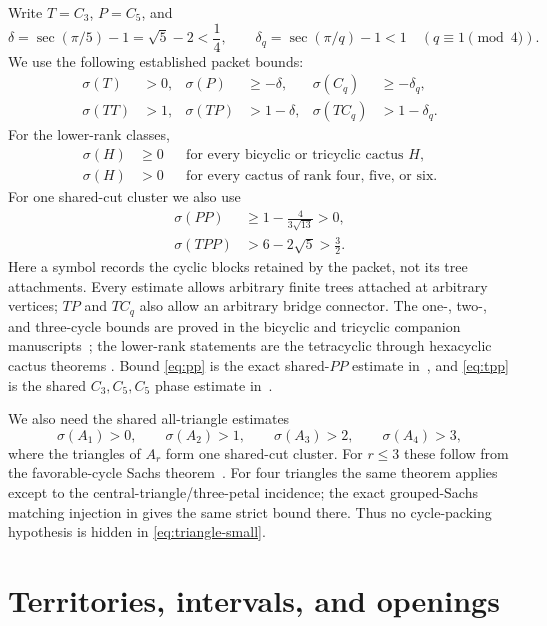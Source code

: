 \documentclass[11pt]{article}
\newcommand{\sig}{\sigma}
\begin{document}
Write $T=C_3$, $P=C_5$, and
\[
 \delta=\sec(\pi/5)-1=\sqrt5-2<\frac14,
 \qquad
 \delta_q=\sec(\pi/q)-1<1\quad(q\equiv1\pmod4).
\]
We use the following established packet bounds:
\begin{align}
 \sig(T)&>0,& \sig(P)&\geq-\delta,&
 \sig(C_q)&\geq-\delta_q,\label{eq:one}\\
 \sig(TT)&>1,& \sig(TP)&>1-\delta,&
 \sig(TC_q)&>1-\delta_q.\label{eq:two}
\end{align}
For the lower-rank classes,
\begin{align}
 \sig(H)&\geq0 &&\text{for every bicyclic or tricyclic cactus }H,
 \label{eq:small}\\
 \sig(H)&>0 &&\text{for every cactus of rank four, five, or six}.
 \label{eq:lower-rank}
\end{align}
For one shared-cut cluster we also use
\begin{align}
 \sig(PP)&\geq1-\frac4{3\sqrt{13}}>0,\label{eq:pp}\\
 \sig(TPP)&>6-2\sqrt5>\frac32.\label{eq:tpp}
\end{align}
Here a symbol records the cyclic blocks retained by the packet, not its tree
attachments.  Every estimate allows arbitrary finite trees attached at
arbitrary vertices; $TP$ and $TC_q$ also allow an arbitrary bridge connector.
The one-, two-, and three-cycle bounds are proved in the bicyclic and
tricyclic companion manuscripts~\cite{Bicyclic,Tricyclic}; the lower-rank
statements are the tetracyclic through hexacyclic cactus theorems
\cite{Tetracyclic,Pentacyclic,Hexacyclic}.  Bound \eqref{eq:pp} is the exact
shared-$PP$ estimate in~\cite{Bicyclic}, and \eqref{eq:tpp} is the shared
$C_3,C_5,C_5$ phase estimate in~\cite{Tricyclic}.

We also need the shared all-triangle estimates
\begin{equation}\label{eq:triangle-small}
 \sig(A_1)>0,
 \qquad \sig(A_2)>1,
 \qquad \sig(A_3)>2,
 \qquad \sig(A_4)>3,
\end{equation}
where the triangles of $A_r$ form one shared-cut cluster.  For $r\leq3$ these
follow from the favorable-cycle Sachs theorem~\cite{PackingTwo}.  For four
triangles the same theorem applies except to the central-triangle/three-petal
incidence; the exact grouped-Sachs matching injection in
\cite[Proposition~4.11]{PackingTwo} gives the same strict bound there.  Thus no
cycle-packing hypothesis is hidden in \eqref{eq:triangle-small}.

\section{Territories, intervals, and openings}
\end{document}
